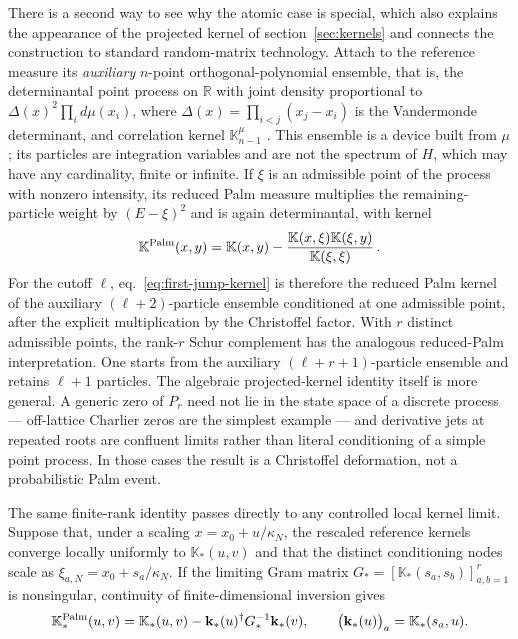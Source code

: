 \documentclass[a4paper,11pt]{article}
\def\dd{d}%
\theoremstyle{definition}
\theoremstyle{remark}
\newcommand{\dd}{\mathrm d}
\newcommand{\RR}{\mathbb R}
\begin{document}
There is a second way to see why the atomic case is special, which also explains the appearance of
the projected kernel of section~\ref{sec:kernels} and connects the construction to standard
random-matrix technology. Attach to the reference measure its \emph{auxiliary} $n$-point
orthogonal-polynomial ensemble, that is, the determinantal point process on $\RR$ with joint density
proportional to $\Delta(x)^2\prod_i\dd\mu(x_i)$, where $\Delta(x)=\prod_{i<j}(x_j-x_i)$ is the
Vandermonde determinant, and correlation kernel $\mathbb K_{n-1}^\mu$
\cite{Borodin2009DPP}. This ensemble is a device built from $\mu$; its particles are integration
variables and are not the spectrum of $H$, which may have any cardinality, finite or infinite.
If $\xi$ is an admissible point of the process with nonzero intensity, its reduced Palm
measure multiplies the remaining-particle weight by $(E-\xi)^2$ and is again determinantal, with
kernel \cite{Borodin2009DPP,Lazag2019Palm} \begin{equation}
   \mathbb K^{\rm Palm}(x,y)
   =\mathbb K(x,y)
    -\frac{\mathbb K(x,\xi)\mathbb K(\xi,y)}{\mathbb K(\xi,\xi)} \,.
   \label{eq:palm-kernel}
\end{equation}
For the cutoff $\ell$, eq.~\eqref{eq:first-jump-kernel} is therefore the reduced Palm
kernel of the auxiliary $(\ell+2)$-particle ensemble conditioned at one admissible point, after
the explicit multiplication by the Christoffel factor.  With $r$ distinct admissible points, the
rank-$r$ Schur complement has the analogous reduced-Palm interpretation. One starts from the
auxiliary $(\ell+r+1)$-particle ensemble and retains $\ell+1$ particles.  The algebraic projected-kernel identity itself is more general.  A generic zero of $P_r$ need not lie in the state space
of a discrete process --- off-lattice Charlier zeros are the simplest example --- and derivative jets
at repeated roots are confluent limits rather than literal conditioning of a simple point
process.  In those cases the result is a Christoffel deformation, not a probabilistic Palm event.

The same finite-rank identity passes directly to any controlled local kernel limit.  Suppose
that, under a scaling $x=x_0+u/\kappa_N$, the rescaled reference kernels converge locally uniformly
to $\mathbb K_*(u,v)$ and that the distinct conditioning nodes scale as
$\xi_{a,N}=x_0+s_a/\kappa_N$.  If the limiting Gram matrix
$G_*=[\mathbb K_*(s_a,s_b)]_{a,b=1}^{r}$ is nonsingular, continuity of finite-dimensional inversion
gives
\begin{equation}
   \mathbb K_*^{\rm Palm}(u,v)
   =\mathbb K_*(u,v)
    -\mathbf k_*(u)^\dagger G_*^{-1}\mathbf k_*(v),
   \qquad
   \bigl(\mathbf k_*(u)\bigr)_a=\mathbb K_*(s_a,u).
   \label{eq:palm-kernel-scaling-limit}
\end{equation}
\end{document}
